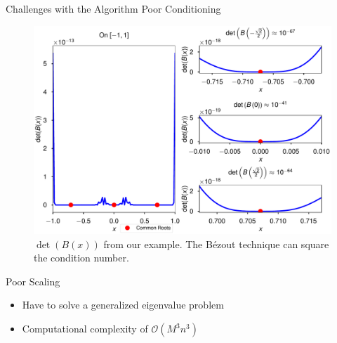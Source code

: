\documentclass[final]{beamer}
\begin{document}
\begin{frame}{}
\begin{columns}[t]
\begin{column}{.31\linewidth}
\begin{block}{Challenges with the Algorithm}
{\color{numhypRed}Poor Conditioning}\\
\begin{center}
\begin{figure}
\includegraphics[width=.71\textwidth]{bezout_det_plot.pdf}
\caption{$\det(B(x))$ from our example. The B\'{e}zout technique can square the condition number. \cite[Sec.\ 5]{nakatsukasa_2013}
}
\end{figure}
\end{center}
{\color{numhypRed}Poor Scaling}\\
\begin{itemize}
\item Have to solve a generalized eigenvalue problem \cite[Sec.\ 3]{nakatsukasa_2013}
\item Computational complexity of $\mathcal{O}(M^3n^3)$ \cite[Sec.\ 4]{nakatsukasa_2013}
\end{itemize}
\end{block}


\end{column}
\end{columns}
\end{frame}
\end{document}
